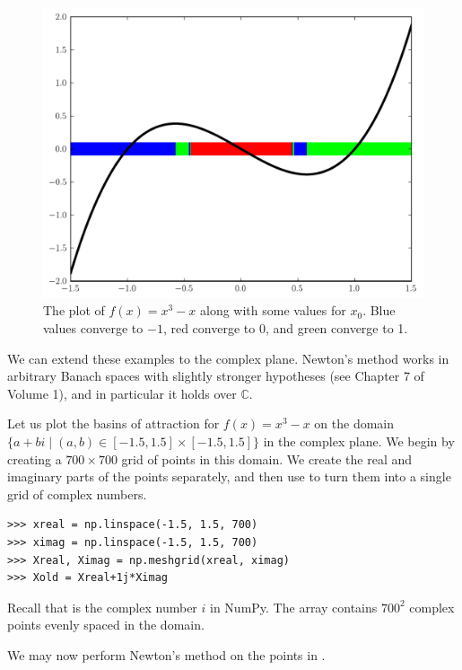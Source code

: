 \begin{figure}
\begin{center}
\includegraphics[scale=0.5]{figures/fractal1d}
\caption{The plot of $f(x) = x^3 -x$ along with some values for $x_0$.
Blue values converge to $-1$, red converge to 0, and green converge to 1.}
\label{fig:fractal_1d}
\end{center}
\end{figure}

We can extend these examples to the complex plane.
Newton's method works in arbitrary Banach spaces with slightly stronger hypotheses (see Chapter 7 of Volume 1), and in particular it holds over $\mathbb{C}$.

Let us plot the basins of attraction for $f(x) = x^3-x$ on the domain $\{a+bi \mid (a, b) \in [-1.5, 1.5] \times [-1.5, 1.5] \}$ in the complex plane.
We begin by creating a $700 \times 700$ grid of points in this domain.
We create the real and imaginary parts of the points separately, and then use  to turn them into a single grid of complex numbers.

\begin{lstlisting}
>>> xreal = np.linspace(-1.5, 1.5, 700)
>>> ximag = np.linspace(-1.5, 1.5, 700)
>>> Xreal, Ximag = np.meshgrid(xreal, ximag)
>>> Xold = Xreal+1j*Ximag
\end{lstlisting}

Recall that  is the complex number $i$ in NumPy.
The array  contains $700^2$ complex points evenly spaced in the domain.

We may now perform Newton's method on the points in .

